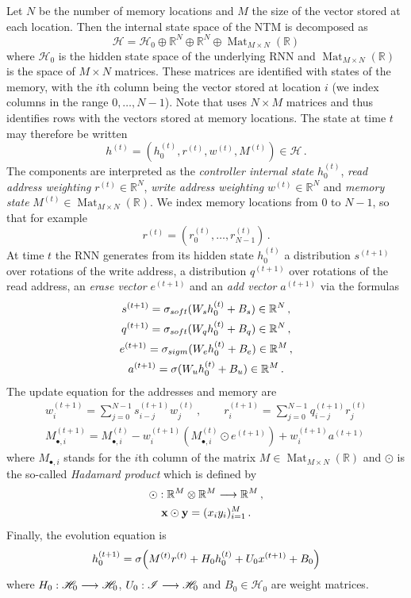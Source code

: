 \documentclass[english,letter paper,12pt,leqno]{article}
\theoremstyle{example}
\numberwithin{equation}{section}
\def\be{\begin{equation}}
\def\ee{\end{equation}}
\begin{document}
Let $N$ be the number of memory locations and $M$ the size of the vector stored at each location. Then the internal state space of the NTM is decomposed as
\be\label{eq:decomp}
\mathscr{H} = \mathscr{H}_0 \oplus \mathbb{R}^N \oplus \mathbb{R}^N \oplus \operatorname{Mat}_{M \times N}(\mathbb{R})
\ee
where $\mathscr{H}_0$ is the hidden state space of the underlying RNN and $\operatorname{Mat}_{M \times N}(\mathbb{R})$ is the space of $M \times N$ matrices. These matrices are identified with states of the memory, with the $i$th column being the vector stored at location $i$ (we index columns in the range $0,\ldots,N-1$). Note that \cite{ntm} uses $N \times M$ matrices and thus identifies rows with the vectors stored at memory locations. The state at time $t$ may therefore be written
\[
h^{(t)} = (h_0^{(t)}, r^{(t)}, w^{(t)}, M^{(t)}) \in \mathscr{H}\,.
\]
The components are interpreted as the \emph{controller internal state} $h_0^{(t)}$, \emph{read address weighting} $r^{(t)} \in \mathbb{R}^N$, \emph{write address weighting} $w^{(t)} \in \mathbb{R}^N$ and \emph{memory state} $M^{(t)} \in \operatorname{Mat}_{M \times N}(\mathbb{R})$. We index memory locations from $0$ to $N - 1$, so that for example
\[
r^{(t)} = (r^{(t)}_0, \ldots, r^{(t)}_{N-1})\,.
\]
At time $t$ the RNN generates from its hidden state $h^{(t)}_0$ a distribution $s^{(t+1)}$ over rotations of the write address, a distribution $q^{(t+1)}$ over rotations of the read address, an \emph{erase vector} $e^{(t+1)}$ and an \emph{add vector} $a^{(t+1)}$ \cite[\S 3.2]{ntm} via the formulas
\begin{gather*}
s^{(t+1)} = \sigma_{soft}( W_s h_0^{(t)} + B_s ) \in \mathbb{R}^N\,,\\
q^{(t+1)} = \sigma_{soft}( W_q h_0^{(t)} + B_q ) \in \mathbb{R}^N\,,\\
e^{(t+1)} = \sigma_{sigm}( W_e h_0^{(t)} + B_e ) \in \mathbb{R}^M\,,\\
a^{(t+1)} = \sigma( W_u h_0^{(t)} + B_u ) \in \mathbb{R}^M\,.
\end{gather*}
The update equation for the addresses \cite[Eq. (8)]{ntm} and memory \cite[Eq. (3),(4)]{ntm} are
\begin{gather}
w^{(t+1)}_i = \sum_{j=0}^{N-1} s^{(t+1)}_{i-j} w^{(t)}_j \,, \qquad r^{(t+1)}_i = \sum_{j=0}^{N-1} q^{(t+1)}_{i-j} r^{(t)}_j \label{eq:ntm_update2}\\
M^{(t+1)}_{\bullet,i} = M^{(t)}_{\bullet,i} - w^{(t+1)}_i (M^{(t)}_{\bullet,i} \odot e^{(t+1)}) + w^{(t+1)}_i a^{(t+1)} \label{eq:ntm_update3}
\end{gather}
where $M_{\bullet,i}$ stands for the $i$th column of the matrix $M \in \operatorname{Mat}_{M \times N}(\mathbb{R})$ and $\odot$ is the so-called \emph{Hadamard product} which is defined by
\begin{gather*}
\odot: \mathbb{R}^M \otimes \mathbb{R}^M \longrightarrow \mathbb{R}^M\,,\\
\bold{x} \odot \bold{y} = ( x_i y_i )_{i=1}^M\,.
\end{gather*}
 Finally, the evolution equation is
\be\label{eq:NTMequation}
h_0^{(t+1)} = \relu\Big( M^{(t)} r^{(t)} + H_0 h_0^{(t)} + U_0 x^{(t+1)} + B_0 \Big)
\ee 
where $H_0: \mathscr{H}_0 \longrightarrow \mathscr{H}_0$, $U_0: \mathscr{I} \longrightarrow \mathscr{H}_0$ and $B_0 \in \mathscr{H}_0$ are weight matrices.
\end{document}
